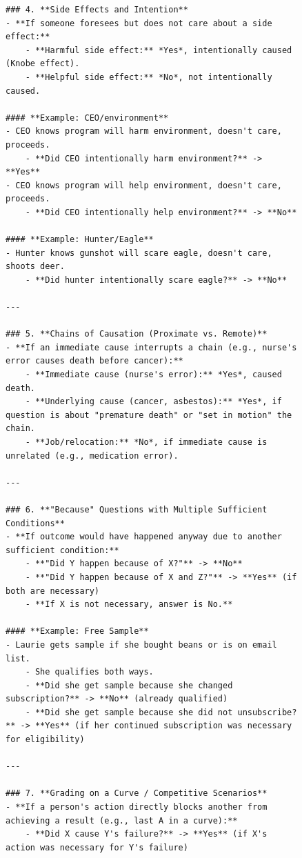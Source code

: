 \begin{figure}[t]
\centering
\begin{tcolorbox}[title=Cheat Sheet for Causal Judgement (2/2), colback=gray!10, colframe=black!70, boxrule=0.5pt, top=0pt, bottom=0pt, left=0pt, right=0pt, arc=0.8mm, width=1.0\textwidth]
\scriptsize
\begin{lstlisting}
### 4. **Side Effects and Intention**
- **If someone foresees but does not care about a side effect:**
    - **Harmful side effect:** *Yes*, intentionally caused (Knobe effect).
    - **Helpful side effect:** *No*, not intentionally caused.

#### **Example: CEO/environment**
- CEO knows program will harm environment, doesn't care, proceeds.
    - **Did CEO intentionally harm environment?** -> **Yes**
- CEO knows program will help environment, doesn't care, proceeds.
    - **Did CEO intentionally help environment?** -> **No**

#### **Example: Hunter/Eagle**
- Hunter knows gunshot will scare eagle, doesn't care, shoots deer.
    - **Did hunter intentionally scare eagle?** -> **No**

---

### 5. **Chains of Causation (Proximate vs. Remote)**
- **If an immediate cause interrupts a chain (e.g., nurse's error causes death before cancer):**
    - **Immediate cause (nurse's error):** *Yes*, caused death.
    - **Underlying cause (cancer, asbestos):** *Yes*, if question is about "premature death" or "set in motion" the chain.
    - **Job/relocation:** *No*, if immediate cause is unrelated (e.g., medication error).

---

### 6. **"Because" Questions with Multiple Sufficient Conditions**
- **If outcome would have happened anyway due to another sufficient condition:**
    - **"Did Y happen because of X?"** -> **No**
    - **"Did Y happen because of X and Z?"** -> **Yes** (if both are necessary)
    - **If X is not necessary, answer is No.**

#### **Example: Free Sample**
- Laurie gets sample if she bought beans or is on email list.
    - She qualifies both ways.
    - **Did she get sample because she changed subscription?** -> **No** (already qualified)
    - **Did she get sample because she did not unsubscribe?** -> **Yes** (if her continued subscription was necessary for eligibility)

---

### 7. **Grading on a Curve / Competitive Scenarios**
- **If a person's action directly blocks another from achieving a result (e.g., last A in a curve):**
    - **Did X cause Y's failure?** -> **Yes** (if X's action was necessary for Y's failure)


\end{lstlisting}
\end{tcolorbox}
\end{figure}
